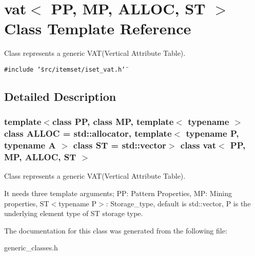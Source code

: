 \section{vat$<$ PP, MP, ALLOC, ST $>$ Class Template Reference}
\label{classvat}
Class represents a generic VAT(Vertical Attribute Table).  


{\tt \#include \char`\"{}src/itemset/iset\_\-vat.h\char`\"{}}



\subsection{Detailed Description}
\subsubsection*{template$<$class PP, class MP, template$<$ typename $>$ class ALLOC = std::allocator, template$<$ typename P, typename A $>$ class ST = std::vector$>$ class vat$<$ PP, MP, ALLOC, ST $>$}

Class represents a generic VAT(Vertical Attribute Table). 

It needs three template arguments; PP: Pattern Properties, MP: Mining properties, ST$<$typename P$>$: Storage\_\-type, default is std::vector, P is the underlying element type of ST storage type. 



The documentation for this class was generated from the following file:\begin{CompactItemize}
\item 
generic\_\-classes.h\end{CompactItemize}
